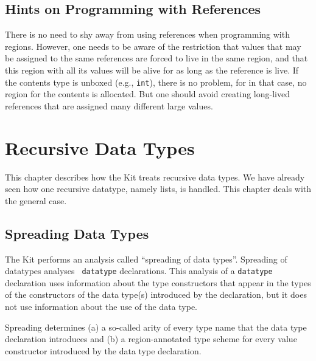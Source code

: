 \documentclass[12pt]{book}
\begin{document}
\section{Hints on Programming  with References}
There is no need to shy away from using references when programming
with regions. However, one needs to be aware of the restriction that
values that may be assigned to the same references are forced to live
in the same region, and that this region with all its values will be
alive for as long as the reference is live. If the contents type is
unboxed (e.g., {\tt int}), there is no problem, for in that case, no
region for the contents is allocated. But one should avoid creating
long-lived references that are assigned many different large values.

\chapter{Recursive Data Types}
\label{datatypes.sec}
This chapter describes how the Kit treats recursive data types. We
have already seen how one recursive datatype, namely lists, is
handled. This chapter deals with the general case.

\section{Spreading Data Types}
The Kit performs an analysis called 
%
``spreading of data types''.  Spreading of datatypes analyses {\tt
  datatype} declarations.  This analysis of a {\tt datatype}
declaration uses information about the type constructors that appear
in the types of the constructors of the data type(s) introduced by the
declaration, but it does not use information about the use of the data
type.

Spreading determines (a) a so-called 
%
arity of every type name that the data type declaration introduces and
(b) a region-annotated type scheme for every value constructor
introduced by the data type declaration.
\end{document}
